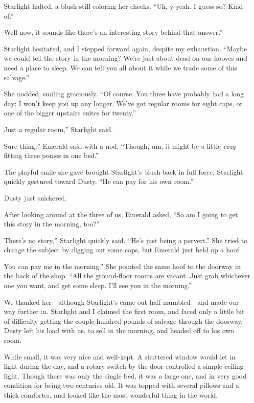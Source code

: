 Starlight halted, a blush still coloring her cheeks. “Uh, y-yeah. I guess so? Kind of.”

\leavevmode{}Well now, it sounds like there’s an interesting story behind that answer.”

Starlight hesitated, and I stepped forward again, despite my exhaustion. “Maybe we could tell the story in the morning? We’re just about dead on our hooves and need a place to sleep. We can tell you all about it while we trade some of this salvage.”

She nodded, smiling graciously. “Of course. You three have probably had a long day; I won’t keep you up any longer. We’ve got regular rooms for eight caps, or one of the bigger upstairs suites for twenty.”

\leavevmode{}Just a regular room,” Starlight said.

\leavevmode{}Sure thing,” Emerald said with a nod. “Though, um, it might be a little \textit{cozy} fitting three ponies in one bed.”

The playful smile she gave brought Starlight’s blush back in full force. Starlight quickly gestured toward Dusty. “He can pay for his own room.”

Dusty just snickered.

After looking around at the three of us, Emerald asked, “So am I going to get this story in the morning, too?”

\leavevmode{}There’s no story,” Starlight quickly said. “He’s just being a pervert.” She tried to change the subject by digging out some caps, but Emerald just held up a hoof.

\leavevmode{}You can pay me in the morning.” She pointed the same hoof to the doorway in the back of the shop. “All the ground-floor rooms are vacant. Just grab whichever one you want, and get some sleep. I’ll see you in the morning.”

We thanked her—although Starlight’s came out half-mumbled—and made our way further in. Starlight and I claimed the first room, and faced only a little bit of difficulty getting the couple hundred pounds of salvage through the doorway. Dusty left his load with us, to sell in the morning, and headed off to his own room.

While small, it was very nice and well-kept. A shuttered window would let in light during the day, and a rotary switch by the door controlled a simple ceiling light. Though there was only the single bed, it was a large one, and in very good condition for being two centuries old. It was topped with several pillows and a thick comforter, and looked like the most wonderful thing in the world.

